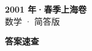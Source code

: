 \documentclass[zihao=-4, a4paper]{ctexart}
\begin{document}
\begin{center}
  {\Large\bfseries 2001 年·春季上海卷}\\[4pt]
  {\large 数学 · 简答版}
\end{center}
\medskip
{}

\clearpage
{}
\begin{center}{\Large\bfseries 答案速查}\end{center}
\medskip

\end{document}
